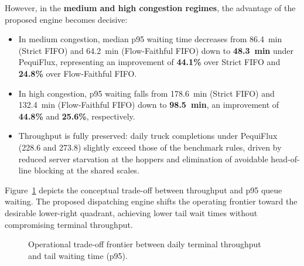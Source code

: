 \documentclass[12pt,a4paper]{article}
\begin{document}
However, in the \textbf{medium and high congestion regimes}, the advantage of the proposed engine becomes decisive:
\begin{itemize}[leftmargin=1.2cm,itemsep=0pt,topsep=2pt]
  \item In medium congestion, median p95 waiting time decreases from 86.4~min (Strict FIFO) and 64.2~min (Flow-Faithful FIFO) down to \textbf{48.3~min} under PequiFlux, representing an improvement of \textbf{44.1\%} over Strict FIFO and \textbf{24.8\%} over Flow-Faithful FIFO.
  \item In high congestion, p95 waiting falls from 178.6~min (Strict FIFO) and 132.4~min (Flow-Faithful FIFO) down to \textbf{98.5~min}, an improvement of \textbf{44.8\%} and \textbf{25.6\%}, respectively.
  \item Throughput is fully preserved: daily truck completions under PequiFlux (228.6 and 273.8) slightly exceed those of the benchmark rules, driven by reduced server starvation at the hoppers and elimination of avoidable head-of-line blocking at the shared scales.
\end{itemize}

Figure~\ref{fig:tradeoff} depicts the conceptual trade-off between throughput and p95 queue waiting. The proposed dispatching engine shifts the operating frontier toward the desirable lower-right quadrant, achieving lower tail wait times without compromising terminal throughput.

\begin{figure}[H]
\centering
{}
\caption{Operational trade-off frontier between daily terminal throughput and tail waiting time (p95).}
\label{fig:tradeoff}
\end{figure}
\end{document}
